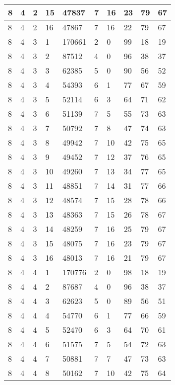 \begin{table}[!ht]
\begin{tabular}{|l|l|l|l|l|l|l|l|l|l|}
        8 & 4 & 2 & 15 & 47837 & 7 & 16 & 23 & 79 & 67 \\ \hline
        8 & 4 & 2 & 16 & 47867 & 7 & 16 & 22 & 79 & 67 \\ \hline
        8 & 4 & 3 & 1 & 170661 & 2 & 0 & 99 & 18 & 19 \\ \hline
        8 & 4 & 3 & 2 & 87512 & 4 & 0 & 96 & 38 & 37 \\ \hline
        8 & 4 & 3 & 3 & 62385 & 5 & 0 & 90 & 56 & 52 \\ \hline
        8 & 4 & 3 & 4 & 54393 & 6 & 1 & 77 & 67 & 59 \\ \hline
        8 & 4 & 3 & 5 & 52114 & 6 & 3 & 64 & 71 & 62 \\ \hline
        8 & 4 & 3 & 6 & 51139 & 7 & 5 & 55 & 73 & 63 \\ \hline
        8 & 4 & 3 & 7 & 50792 & 7 & 8 & 47 & 74 & 63 \\ \hline
        8 & 4 & 3 & 8 & 49942 & 7 & 10 & 42 & 75 & 65 \\ \hline
        8 & 4 & 3 & 9 & 49452 & 7 & 12 & 37 & 76 & 65 \\ \hline
        8 & 4 & 3 & 10 & 49260 & 7 & 13 & 34 & 77 & 65 \\ \hline
        8 & 4 & 3 & 11 & 48851 & 7 & 14 & 31 & 77 & 66 \\ \hline
        8 & 4 & 3 & 12 & 48574 & 7 & 15 & 28 & 78 & 66 \\ \hline
        8 & 4 & 3 & 13 & 48363 & 7 & 15 & 26 & 78 & 67 \\ \hline
        8 & 4 & 3 & 14 & 48259 & 7 & 16 & 25 & 79 & 67 \\ \hline
        8 & 4 & 3 & 15 & 48075 & 7 & 16 & 23 & 79 & 67 \\ \hline
        8 & 4 & 3 & 16 & 48013 & 7 & 16 & 21 & 79 & 67 \\ \hline
        8 & 4 & 4 & 1 & 170776 & 2 & 0 & 98 & 18 & 19 \\ \hline
        8 & 4 & 4 & 2 & 87687 & 4 & 0 & 96 & 38 & 37 \\ \hline
        8 & 4 & 4 & 3 & 62623 & 5 & 0 & 89 & 56 & 51 \\ \hline
        8 & 4 & 4 & 4 & 54770 & 6 & 1 & 77 & 66 & 59 \\ \hline
        8 & 4 & 4 & 5 & 52470 & 6 & 3 & 64 & 70 & 61 \\ \hline
        8 & 4 & 4 & 6 & 51575 & 7 & 5 & 54 & 72 & 63 \\ \hline
        8 & 4 & 4 & 7 & 50881 & 7 & 7 & 47 & 73 & 63 \\ \hline
        8 & 4 & 4 & 8 & 50162 & 7 & 10 & 42 & 75 & 64 \\ \hline

\end{tabular}
\end{table}
